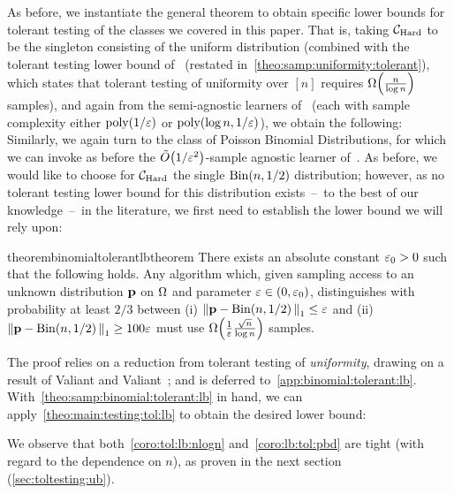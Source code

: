 As before, we instantiate the general theorem to obtain specific lower bounds for tolerant testing of the classes we covered in this paper. That is, taking $\mathcal{C}_{\rm Hard}$ to be the singleton consisting of the uniform distribution (combined with the tolerant testing lower bound of~\cite{ValiantValiant:10lb} (restated in~\cref{theo:samp:uniformity:tolerant}), which states that tolerant testing of uniformity over $[n]$ requires $\bigOmega{\frac{n}{\log n}}$ samples), and again from the semi-agnostic learners of~\cite{CDSS:13,CDSS:14} (each with sample complexity either $\operatorname*{poly}(1/\varepsilon)$ or $\operatorname*{poly}(\log n,1/\varepsilon)$), we obtain the following:
\corolbtolnlogn*
Similarly, we again turn to the class of Poisson Binomial Distributions, for which we can invoke as before the $\tildeO{1/\eps^2}$-sample agnostic learner of~\cite{DDS:PBD:12}. As before, we would like to choose for $\mathcal{C}_{\rm Hard}$ the single $\operatorname{Bin}\!\left( n, 1/2 \right)$ distribution; however, as no tolerant testing lower bound for this distribution exists~--~to the best of our knowledge~--~in the literature, we first need to establish the lower bound we will rely upon:

\begin{restatable}{theorem}{binomialtolerantlbtheorem}\label{theo:samp:binomial:tolerant:lb}
    There exists an absolute constant $\varepsilon_0>0$ such that the following holds. Any algorithm which, given sampling access to an unknown distribution $\mathbf{p}$ on ${\Omega}$ and parameter $\varepsilon \in (0,\varepsilon_0)$, distinguishes with probability at least $2/3$ between \textsf{(i)} ${\lVert\mathbf{p}-\operatorname{Bin}\!\left( n, 1/2 \right){\rVert}}_1 \leq \varepsilon$ and \textsf{(ii)} ${\lVert\mathbf{p}-\operatorname{Bin}\!\left( n, 1/2 \right){\rVert}}_1 \geq 100\varepsilon$ must use $\bigOmega{\frac{1}{\eps}\frac{\sqrt{n}}{\log n}}$ samples.
\end{restatable}
The proof relies on a reduction from tolerant testing of \emph{uniformity}, drawing on a result of Valiant and Valiant~\cite{ValiantValiant:10lb}; and is deferred to~\cref{app:binomial:tolerant:lb}. With~\cref{theo:samp:binomial:tolerant:lb} in hand, we can apply~\cref{theo:main:testing:tol:lb} to obtain the desired lower bound:
\corolbtolpbd*

\noindent We observe that both~\cref{coro:tol:lb:nlogn} and~\cref{coro:lb:tol:pbd} are tight (with regard to the dependence on $n$), as proven in the next section (\cref{sec:toltesting:ub}).

